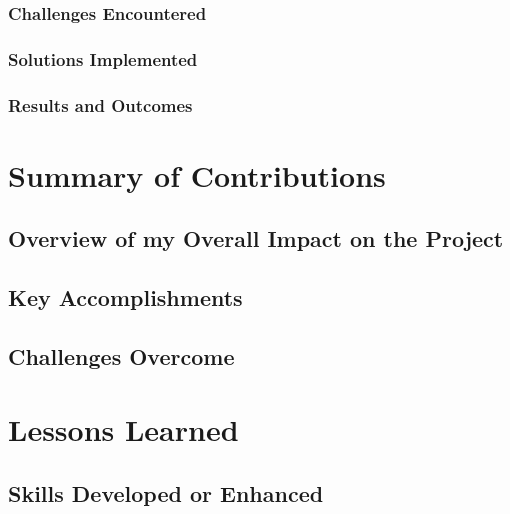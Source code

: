 \documentclass[
  11pt,
]{article}
\begin{document}
\hypertarget{challenges-encountered}{%
\subsubsection{Challenges Encountered}\label{challenges-encountered}}

\hypertarget{solutions-implemented}{%
\subsubsection{Solutions Implemented}\label{solutions-implemented}}

\hypertarget{results-and-outcomes}{%
\subsubsection{Results and Outcomes}\label{results-and-outcomes}}

\hypertarget{summary-of-contributions}{%
\section{Summary of Contributions}\label{summary-of-contributions}}

\hypertarget{overview-of-my-overall-impact-on-the-project}{%
\subsection{Overview of my Overall Impact on the
Project}\label{overview-of-my-overall-impact-on-the-project}}

\hypertarget{key-accomplishments}{%
\subsection{Key Accomplishments}\label{key-accomplishments}}

\hypertarget{challenges-overcome}{%
\subsection{Challenges Overcome}\label{challenges-overcome}}

\hypertarget{lessons-learned}{%
\section{Lessons Learned}\label{lessons-learned}}

\hypertarget{skills-developed-or-enhanced}{%
\subsection{Skills Developed or
Enhanced}\label{skills-developed-or-enhanced}}
\end{document}
